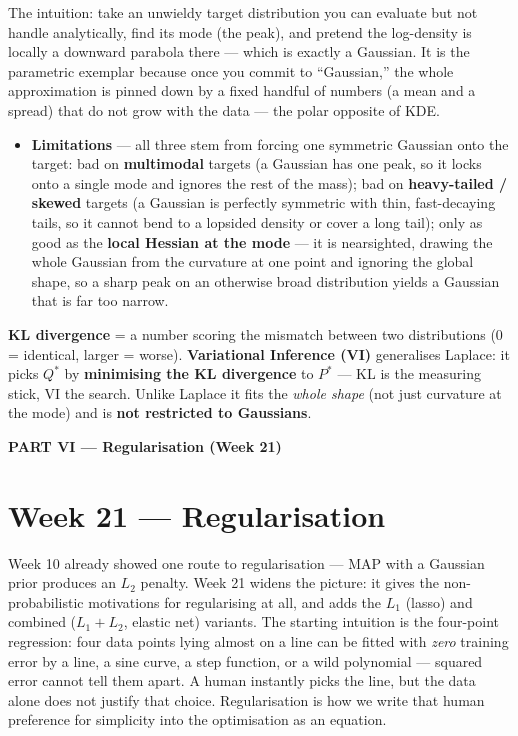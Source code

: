 \documentclass[11pt, a4paper]{article}
\newcommand{\kw}[1]{\textbf{#1}}
\begin{document}
The intuition: take an unwieldy target distribution you can evaluate but not handle analytically,
find its mode (the peak), and pretend the log-density is locally a downward parabola there — which
is exactly a Gaussian. It is the parametric exemplar because once you commit to ``Gaussian,'' the
whole approximation is pinned down by a fixed handful of numbers (a mean and a spread) that do not
grow with the data — the polar opposite of KDE.

\begin{itemize}
  \item \kw{Limitations} — all three stem from forcing one symmetric Gaussian onto the target:
  bad on \kw{multimodal} targets (a Gaussian has one peak, so it locks onto a single mode and
  ignores the rest of the mass); bad on \kw{heavy-tailed / skewed} targets (a Gaussian is perfectly
  symmetric with thin, fast-decaying tails, so it cannot bend to a lopsided density or cover a long
  tail); only as good as the \kw{local Hessian at the mode} — it is nearsighted, drawing the whole
  Gaussian from the curvature at one point and ignoring the global shape, so a sharp peak on an
  otherwise broad distribution yields a Gaussian that is far too narrow.
\end{itemize}

\begin{notebox}
\kw{KL divergence} = a number scoring the mismatch between two distributions ($0$ = identical,
larger = worse). \kw{Variational Inference (VI)} generalises Laplace: it picks $Q^\ast$ by
\kw{minimising the KL divergence} to $P^\ast$ — KL is the measuring stick, VI the search. Unlike
Laplace it fits the \emph{whole shape} (not just curvature at the mode) and is \kw{not restricted to
Gaussians}.
\end{notebox}

\begin{center}\large\bfseries\color{defBd} PART VI — Regularisation (Week 21)\end{center}

\section{Week 21 — Regularisation}

Week 10 already showed one route to regularisation — MAP with a Gaussian prior produces an $L_2$
penalty. Week 21 widens the picture: it gives the non-probabilistic motivations for regularising at
all, and adds the $L_1$ (lasso) and combined ($L_1{+}L_2$, elastic net) variants. The starting
intuition is the four-point regression: four data points lying almost on a line can be fitted with
\emph{zero} training error by a line, a sine curve, a step function, or a wild polynomial — squared
error cannot tell them apart. A human instantly picks the line, but the data alone does not justify
that choice. Regularisation is how we write that human preference for simplicity into the
optimisation as an equation.
\end{document}
